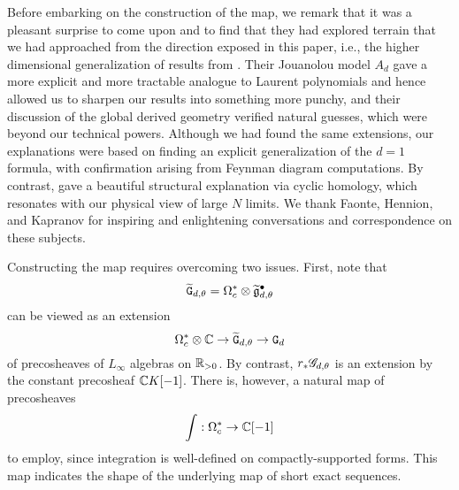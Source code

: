 \begin{rmk}
Before embarking on the construction of the map,
we remark that it was a pleasant surprise to come upon \cite{FHK} 
and to find that they had explored terrain that we had approached from the direction exposed in this paper,
i.e., the higher dimensional generalization of results from \cite{CG1}.
Their Jouanolou model $A_d$ gave a more explicit and more tractable analogue to Laurent polynomials and hence allowed us to sharpen our results into something more punchy,
and their discussion of the global derived geometry verified natural guesses, 
which were beyond our technical powers.
Although we had found the same extensions, 
our explanations were based on finding an explicit generalization of the $d=1$ formula,
with confirmation arising from Feynman diagram computations.
By contrast,  \cite{FHK} gave a beautiful structural explanation via cyclic homology,
which resonates with our physical view of large $N$ limits.
We thank Faonte, Hennion, and Kapranov for inspiring and enlightening conversations and correspondence on these subjects.
\end{rmk}

Constructing the map requires overcoming two issues.
First, note that 
\[
\widetilde{\mathtt{G}}_{d,\theta} = \Omega^*_c \otimes \widetilde{\mathfrak g}^\bullet_{d,\theta}
\]
can be viewed as an extension
\[
\Omega^*_c \otimes \mathbb C \to \widetilde{\mathtt{G}}_{d,\theta} \to \mathtt{G}_d
\]
of precosheaves of $L_\infty$ algebras on $\mathbb R_{>0}$.
By contrast, $r_* \mathscr G_{d,\theta}$ is an extension by the constant precosheaf $\mathbb C K[-1]$.
There is, however, a natural map of precosheaves
\[
\int: \Omega^*_c \to \mathbb C[-1]
\]
to employ, since integration is well-defined on compactly-supported forms.
This map indicates the shape of the underlying map of short exact sequences.

